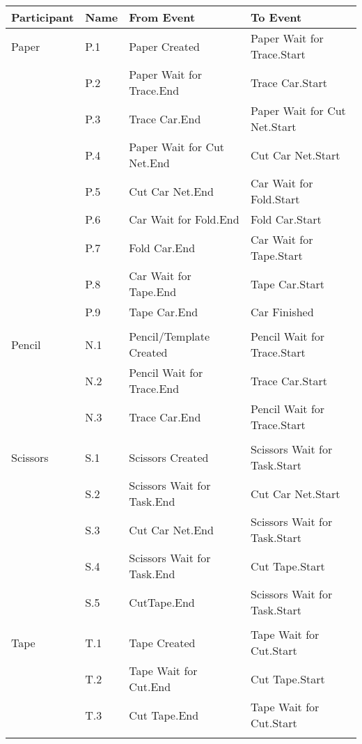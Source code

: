 \begin{tabular}{p{2.4cm}>{\raggedright\arraybackslash}p{1.2cm}>{\raggedright\arraybackslash}p{5.9cm}>{\raggedright\arraybackslash}p{5.9cm}}
\toprule
Participant & Name & From Event & To Event       \\ \midrule
Paper & P.1 & Paper Created & Paper Wait for Trace.Start \\
      & P.2 & Paper Wait for Trace.End & Trace Car.Start \\
      & P.3 & Trace Car.End & Paper Wait for Cut Net.Start \\
      & P.4 & Paper Wait for Cut Net.End & Cut Car Net.Start \\
      & P.5 & Cut Car Net.End & Car Wait for Fold.Start \\
      & P.6 & Car Wait for Fold.End & Fold Car.Start \\
      & P.7 & Fold Car.End & Car Wait for Tape.Start \\
      & P.8 & Car Wait for Tape.End & Tape Car.Start \\
      & P.9 & Tape Car.End & Car Finished \\
      &      &              &              \\
Pencil & N.1 & Pencil/Template Created & Pencil Wait for Trace.Start \\
       & N.2 & Pencil Wait for Trace.End & Trace Car.Start \\
       & N.3 & Trace Car.End & Pencil Wait for Trace.Start \\
       &      &              &              \\
Scissors & S.1 & Scissors Created & Scissors Wait for Task.Start \\
       & S.2   & Scissors Wait for Task.End & Cut Car Net.Start \\
       & S.3   & Cut Car Net.End & Scissors Wait for Task.Start \\
       & S.4   & Scissors Wait for Task.End & Cut Tape.Start             \\
       & S.5   & CutTape.End & Scissors Wait for Task.Start \\
       &      &              &              \\
Tape   & T.1 & Tape Created & Tape Wait for Cut.Start \\
       & T.2 & Tape Wait for Cut.End & Cut Tape.Start \\
       & T.3 & Cut Tape.End & Tape Wait for Cut.Start \\
       &      &              &              \\

\end{tabular}
